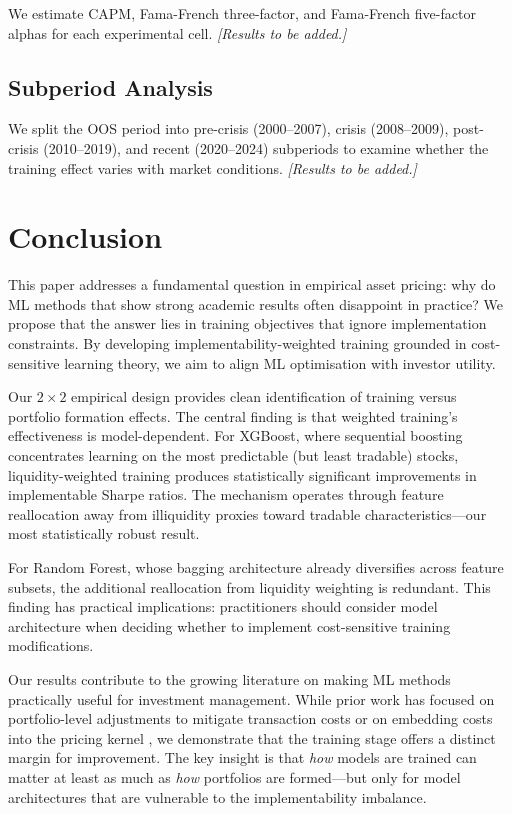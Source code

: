 \documentclass[a4paper,12pt,final]{article}
\begin{document}
We estimate CAPM, Fama-French three-factor, and Fama-French five-factor alphas for each experimental cell. \emph{[Results to be added.]}

\subsection{Subperiod Analysis}
\label{subsec:subperiod}

We split the OOS period into pre-crisis (2000--2007), crisis (2008--2009), post-crisis (2010--2019), and recent (2020--2024) subperiods to examine whether the training effect varies with market conditions. \emph{[Results to be added.]}


\section{Conclusion}
\label{sec:conclusion}

This paper addresses a fundamental question in empirical asset pricing: why do ML methods that show strong academic results often disappoint in practice? We propose that the answer lies in training objectives that ignore implementation constraints. By developing implementability-weighted training grounded in cost-sensitive learning theory, we aim to align ML optimisation with investor utility.

Our $2\times 2$ empirical design provides clean identification of training versus portfolio formation effects. The central finding is that weighted training's effectiveness is model-dependent. For XGBoost, where sequential boosting concentrates learning on the most predictable (but least tradable) stocks, liquidity-weighted training produces statistically significant improvements in implementable Sharpe ratios. The mechanism operates through feature reallocation away from illiquidity proxies toward tradable characteristics---our most statistically robust result.

For Random Forest, whose bagging architecture already diversifies across feature subsets, the additional reallocation from liquidity weighting is redundant. This finding has practical implications: practitioners should consider model architecture when deciding whether to implement cost-sensitive training modifications.

Our results contribute to the growing literature on making ML methods practically useful for investment management. While prior work has focused on portfolio-level adjustments to mitigate transaction costs \citep{jensen2024machine} or on embedding costs into the pricing kernel \citep{bianchi2026transaction}, we demonstrate that the training stage offers a distinct margin for improvement. The key insight is that \emph{how} models are trained can matter at least as much as \emph{how} portfolios are formed---but only for model architectures that are vulnerable to the implementability imbalance.
\end{document}
